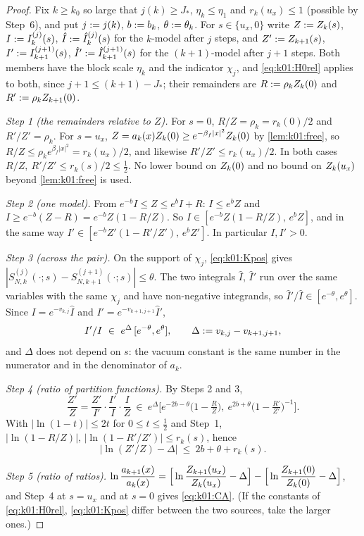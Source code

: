 \begin{proof}
Fix $k\ge k_0$ so large that $j(k)\ge J_*$, $\eta_k\le\eta_1$ and $r_k(u_x)\le1$ (possible by Step~6), and put $j:= j(k)$, $b:= b_k$, $\theta:=\theta_k$. For $s\in\{u_x,0\}$ write $Z:=Z_{k}(s)$, $I:=I^{(j)}_{k}(s)$, $\hat I:=\hat I^{(j)}_{k}(s)$ for the $k$-model after $j$ steps, and $Z':= Z_{k+1}(s)$, $I':= I^{(j+1)}_{k+1}(s)$, $\hat I':=\hat I^{(j+1)}_{k+1}(s)$ for the $(k+1)$-model after $j+1$ steps. Both members have the block scale $\eta_k$ and the indicator $\chi_j$, and \eqref{eq:k01:H0rel} applies to both, since $j+1\le(k+1)-J_*$; their remainders are $R:=\rho_kZ_{k}(0)$ and $R':=\rho_kZ_{k+1}(0)$.

\emph{Step 1 (the remainders relative to $Z$).} For $s=0$, $R/Z=\rho_k=r_k(0)/2$ and $R'/Z'=\rho_k$. For $s=u_x$, $Z=a_k(x)Z_{k}(0)\ge e^{-\beta_f|x|^2}Z_{k}(0)$ by \cref{lem:k01:free}, so $R/Z\le\rho_ke^{\beta_f|x|^2}=r_k(u_x)/2$, and likewise $R'/Z'\le r_k(u_x)/2$. In both cases $R/Z,\ R'/Z'\le r_k(s)/2\le\frac12$. No lower bound on $Z_{k}(0)$ and no bound on $Z_{k}(u_x)$ beyond \cref{lem:k01:free} is used.

\emph{Step 2 (one model).} From $e^{-b}I\le Z\le e^{b}I+R$: $I\le e^{b}Z$ and $I\ge e^{-b}(Z-R)=e^{-b}Z(1-R/Z)$. So $I\in[e^{-b}Z(1-R/Z),\,e^{b}Z]$, and in the same way $I'\in[e^{-b}Z'(1-R'/Z'),\,e^{b}Z']$. In particular $I,I'>0$.

\emph{Step 3 (across the pair).} On the support of $\chi_j$, \eqref{eq:k01:Kpos} gives $|S^{(j)}_{N,k}(\cdot;s)-S^{(j+1)}_{N,k+1}(\cdot;s)|\le\theta$. The two integrals $\hat I$, $\hat I'$ run over the same variables with the same $\chi_j$ and have non-negative integrands, so $\hat I'/\hat I\in[e^{-\theta},e^{\theta}]$. Since $I=e^{-v_{k,j}}\hat I$ and $I'=e^{-v_{k+1,j+1}}\hat I'$,
\[
I'/I\ \in\ e^{\Delta}\,[e^{-\theta},e^{\theta}],\qquad \Delta\defeq v_{k,j}-v_{k+1,j+1},
\]
and $\Delta$ does not depend on $s$: the vacuum constant is the same number in the numerator and in the denominator of $a_k$.

\emph{Step 4 (ratio of partition functions).} By Steps 2 and 3,
\[
\frac{Z'}{Z}=\frac{Z'}{I'}\cdot\frac{I'}{I}\cdot\frac{I}{Z}\ \in\ e^{\Delta}\Big[e^{-2b-\theta}\big(1-\tfrac RZ\big),\ e^{2b+\theta}\big(1-\tfrac{R'}{Z'}\big)^{-1}\Big].
\]
With $|\ln(1-t)|\le2t$ for $0\le t\le\frac12$ and Step~1, $|\ln(1-R/Z)|,\,|\ln(1-R'/Z')|\le r_k(s)$, hence
\[
\big|\ln(Z'/Z)-\Delta\big|\ \le\ 2b+\theta+r_k(s).
\]

\emph{Step 5 (ratio of ratios).} $\ln\dfrac{a_{k+1}(x)}{a_k(x)}=\Big[\ln\dfrac{Z_{k+1}(u_x)}{Z_{k}(u_x)}-\Delta\Big]-\Big[\ln\dfrac{Z_{k+1}(0)}{Z_{k}(0)}-\Delta\Big]$, and Step~4 at $s=u_x$ and at $s=0$ gives \eqref{eq:k01:CA}. (If the constants of \eqref{eq:k01:H0rel}, \eqref{eq:k01:Kpos} differ between the two sources, take the larger ones.)


\end{proof}
